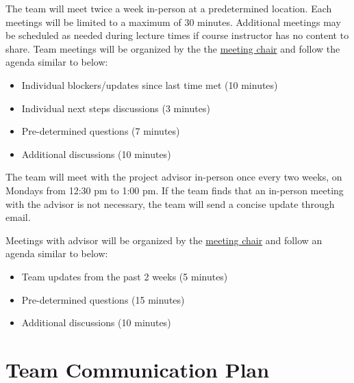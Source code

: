 \documentclass{article}
\begin{document}
The team will meet twice a week in-person at a predetermined location. Each
meetings will be limited to a maximum of 30 minutes. Additional meetings may be
scheduled as needed during lecture times if course instructor has no content to
share. Team meetings will be organized by the the
\hyperref[role:meeting_chair]{meeting chair} and follow the agenda similar to
below:

\begin{itemize}
  \item Individual blockers/updates since last time met (10 minutes)
  \item Individual next steps discussions (3 minutes)
  \item Pre-determined questions (7 minutes)
  \item Additional discussions (10 minutes)
\end{itemize}

The team will meet with the project advisor in-person once every two weeks, on
Mondays from 12:30 pm to 1:00 pm. If the team finds that an in-person meeting
with the advisor is not necessary, the team will send a concise update through
email.

Meetings with advisor will be organized by the
\hyperref[role:meeting_chair]{meeting chair} and follow an agenda similar to
below:

\begin{itemize}
  \item Team updates from the past 2 weeks (5 minutes)
  \item Pre-determined questions (15 minutes)
  \item Additional discussions (10 minutes)
\end{itemize}

\section{Team Communication Plan}
\end{document}
